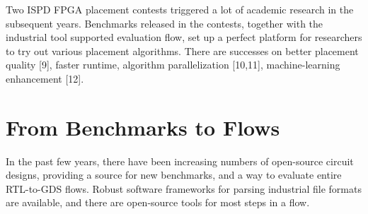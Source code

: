 \documentclass[sigconf]{acmart}
\begin{document}
Two ISPD FPGA placement contests triggered a lot of academic research
in the subsequent years. Benchmarks released in the contests, together
with the industrial tool supported evaluation flow, set up a perfect
platform for researchers to try out various placement
algorithms. There are successes on better placement quality\cite{sy9} [9],
faster runtime, algorithm parallelization\cite{sy10,sy11} [10,11], machine-learning
enhancement\cite{sy12} [12].



\iffalse
\subsection{Deep Learning Accelerator Placement, 2020}

Include this?  Not really placement, but placement-ish?
\fi


\section{From Benchmarks to Flows}

In the past few years, there have been increasing
numbers of open-source circuit designs,
providing a source 
for new benchmarks, and a way to evaluate entire
RTL-to-GDS flows.  Robust software frameworks for
parsing industrial file formats are available,
and there are open-source tools for most steps
in a flow.

\iffalse

Striking a balance between objectives.  Industry groups
would certainly like a production-ready tool, but this is
something that a small team of graduate students can't
build quickly.

Need to capture the essence of a problem, while keeping it
tractable.  Make the benchmark hard to game, so that solutions
actually resemble what we might want ``in practice.''

Trade-off on using library for parsing -- locks into a build
system, sometimes a language and set of tools.  Simple
file formats, by contrast, may lose the essential elements
that matter for an industrial design.

Evaluators, with painstaking detail, are important.

Complex tool flows for evaluation are trouble.

\fi


\end{document}

